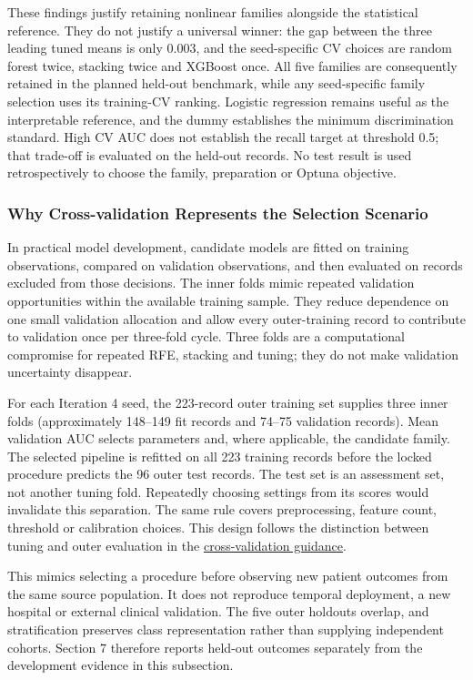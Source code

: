 These findings justify retaining nonlinear families alongside the statistical reference. They do not justify a universal winner: the gap between the three leading tuned means is only 0.003, and the seed-specific CV choices are random forest twice, stacking twice and XGBoost once. All five families are consequently retained in the planned held-out benchmark, while any seed-specific family selection uses its training-CV ranking. Logistic regression remains useful as the interpretable reference, and the dummy establishes the minimum discrimination standard. High CV AUC does not establish the recall target at threshold 0.5; that trade-off is evaluated on the held-out records. No test result is used retrospectively to choose the family, preparation or Optuna objective.

\subsubsection{Why Cross-validation Represents the Selection Scenario}
In practical model development, candidate models are fitted on training observations, compared on validation observations, and then evaluated on records excluded from those decisions. The inner folds mimic repeated validation opportunities within the available training sample. They reduce dependence on one small validation allocation and allow every outer-training record to contribute to validation once per three-fold cycle. Three folds are a computational compromise for repeated RFE, stacking and tuning; they do not make validation uncertainty disappear.

For each Iteration 4 seed, the 223-record outer training set supplies three inner folds (approximately 148--149 fit records and 74--75 validation records). Mean validation AUC selects parameters and, where applicable, the candidate family. The selected pipeline is refitted on all 223 training records before the locked procedure predicts the 96 outer test records. The test set is an assessment set, not another tuning fold. Repeatedly choosing settings from its scores would invalidate this separation. The same rule covers preprocessing, feature count, threshold or calibration choices. This design follows the distinction between tuning and outer evaluation in the \href{https://scikit-learn.org/stable/modules/cross_validation.html}{cross-validation guidance}.

This mimics selecting a procedure before observing new patient outcomes from the same source population. It does not reproduce temporal deployment, a new hospital or external clinical validation. The five outer holdouts overlap, and stratification preserves class representation rather than supplying independent cohorts. Section 7 therefore reports held-out outcomes separately from the development evidence in this subsection.

